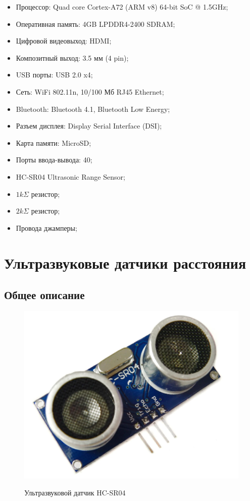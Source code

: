 \documentclass[a4paper, 14pt]{article}
\begin{document}
\begin{itemize}
	\item Процессор: Quad core Cortex-A72 (ARM v8) 64-bit SoC @ 1.5GHz;
	\item Оперативная память: 4GB LPDDR4-2400 SDRAM;
	\item Цифровой видеовыход: HDMI;
	\item Композитный выход: 3.5 мм (4 pin);
	\item USB порты: USB 2.0 x4;
	\item Сеть: WiFi 802.11n, 10/100 Мб RJ45 Ethernet;
	\item Bluetooth: Bluetooth 4.1, Bluetooth Low Energy;
	\item Разъем дисплея: Display Serial Interface (DSI);
	\item Карта памяти: MicroSD;
	\item Порты ввода-вывода: 40;
	\item HC-SR04 Ultrasonic Range Sensor;
	\item $1k\Sigma$ резистор;
	\item $2k\Sigma$ резистор;
	\item Провода джамперы;
\end{itemize}

\newpage
\section{Ультразвуковые датчики расстояния}

\subsection{Общее описание}

\begin{figure}[H]
	\centering
	\includegraphics[width=15cm]{screenshots/1.png}\\
	\caption{Ультразвуковой датчик HC-SR04}
\end{figure}
\end{document}
